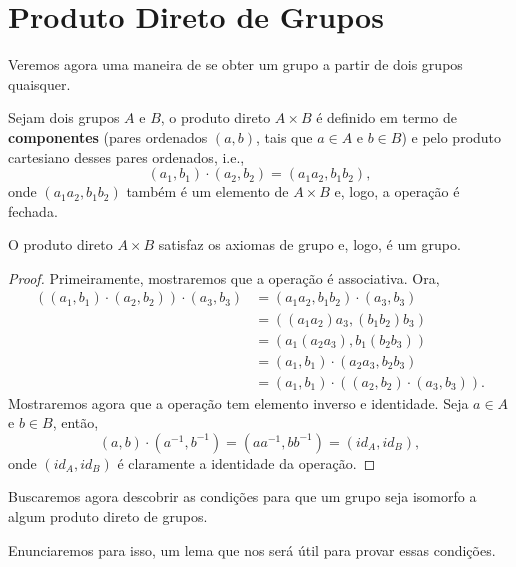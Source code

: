 \documentclass[11pt,openany]{book}
\begin{document}
\chapter{Produto Direto de Grupos}

Veremos agora uma maneira de se obter um grupo a partir de dois grupos quaisquer.

\begin{definition}
\label{def:produto_direto}
    Sejam dois grupos $A$ e $B$, o produto direto $A \times B$ é definido em termo de \textbf{componentes} (pares ordenados $(a,b)$, tais que $a \in A$ e $b \in B$) e pelo produto cartesiano desses pares ordenados, i.e.,
    \[(a_1, b_1) \cdot (a_2, b_2) = (a_1 a_2, b_1 b_2),\]
    onde $(a_1 a_2, b_1 b_2)$ também é um elemento de $A\times B$ e, logo, a operação é fechada.
\end{definition}

\begin{proposition}
\label{proposition:direct_product_is_a_group}
    O produto direto $A\times B$ satisfaz os axiomas de grupo e, logo, é um grupo.
\end{proposition}

\begin{proof}
    Primeiramente, mostraremos que a operação é associativa. Ora,
    \begin{align*}
        ((a_1, b_1) \cdot (a_2, b_2)) \cdot (a_3, b_3) &= (a_1a_2, b_1b_2) \cdot (a_3, b_3) \\
        &= ((a_1a_2)a_3, (b_1b_2)b_3) \\
        &= (a_1(a_2a_3), b_1(b_2b_3)) \\
        &= (a_1, b_1) \cdot (a_2a_3, b_2b_3) \\
        &= (a_1, b_1) \cdot ((a_2, b_2)\cdot(a_3, b_3)).
    \end{align*}
    Mostraremos agora que a operação tem elemento inverso e identidade. Seja $a \in A$ e $b \in B$, então,
    \[(a,b) \cdot (a^{-1},b^{-1}) = (aa^{-1},bb^{-1}) = (id_A,id_B),\]
    onde $(id_A,id_B)$ é claramente a identidade da operação.
\end{proof}

Buscaremos agora descobrir as condições para que um grupo seja isomorfo a algum produto direto de grupos.

Enunciaremos para isso, um lema que nos será útil para provar essas condições.
\end{document}
